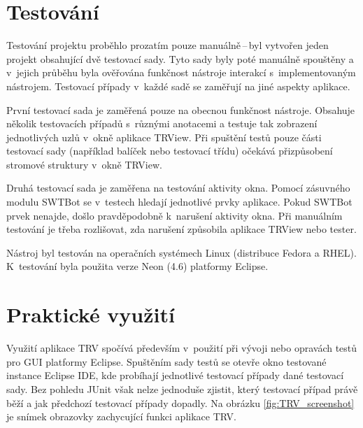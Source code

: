   \section{Testování}
  Testování projektu proběhlo prozatím pouze manuálně\,--\,byl vytvořen jeden projekt obsahující dvě testovací sady. Tyto sady byly poté manuálně spouštěny a v~jejich průběhu byla ověřována funkčnost nástroje interakcí s~implementovaným nástrojem. Testovací případy v~každé sadě se zaměřují na jiné aspekty aplikace.

  První testovací sada je zaměřená pouze na obecnou funkčnost nástroje. Obsahuje několik testovacích případů s~různými anotacemi a testuje tak zobrazení jednotlivých uzlů v~okně aplikace TRView. Při spuštění testů pouze části testovací sady (například balíček nebo testovací třídu) očekává přizpůsobení stromové struktury v~okně TRView.

  Druhá testovací sada je zaměřena na testování aktivity okna. Pomocí zásuvného modulu SWTBot se v~testech hledají jednotlivé prvky aplikace. Pokud SWTBot prvek nenajde, došlo pravděpodobně k~narušení aktivity okna. Při manuálním testování je třeba rozlišovat, zda narušení způsobila aplikace TRView nebo tester.

  Nástroj byl testován na operačních systémech Linux (distribuce Fedora a RHEL). K~testování byla použita verze Neon (4.6) platformy Eclipse.

  \section{Praktické využití}
  Využití aplikace TRV spočívá především v~použití při vývoji nebo opravách testů pro GUI platformy Eclipse. Spuštěním sady testů se otevře okno testované instance Eclipse IDE, kde probíhají jednotlivé testovací případy dané testovací sady. Bez pohledu JUnit však nelze jednoduše zjistit, který testovací případ právě běží a jak předchozí testovací případy dopadly. Na obrázku \ref{fig:TRV_screenshot} je snímek obrazovky zachycující funkci aplikace TRV.

